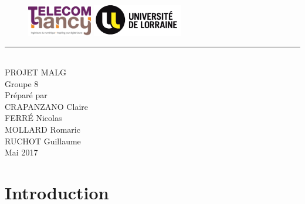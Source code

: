 \documentclass{scrreprt}
\date{}
\begin{document}
\thispagestyle{empty}
\begin{bfseries}
    \begin{figure}
      \includegraphics[height=1.4cm]{images/tn.png}
      \hspace{1.2cm}
      \includegraphics[height=1.4cm]{images/ul.png}
      \vspace{3cm}
    \end{figure}
    \begin{flushright}
      \rule{\paperwidth}{1pt}
      \\
      \vspace{2cm}
      \Huge{PROJET MALG}\\
      \vspace{0.5cm}
      \huge
      Groupe 8\\
      \vspace{1.9cm}
      \Large
      \vspace*{\fill}
      Préparé par\\
      \vspace{0.5cm}
      CRAPANZANO Claire\\
      FERRÉ Nicolas\\
      MOLLARD Romaric\\
      RUCHOT Guillaume\\
      \vspace{1.9cm}
      \small
      Mai 2017\\
    \end{flushright}
\end{bfseries}

\clearpage
\setcounter{page}{1}

\tableofcontents
\begin{center}

\end{center}


\chapter{Introduction}
\end{document}
